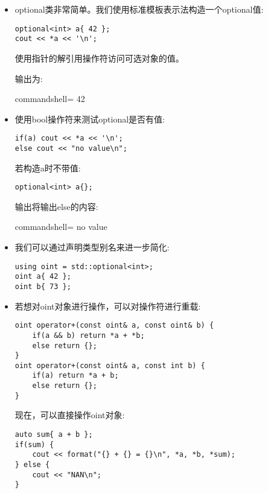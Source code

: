 \begin{itemize}
\item 
optional类非常简单。我们使用标准模板表示法构造一个optional值:

\begin{lstlisting}[style=styleCXX]
optional<int> a{ 42 };
cout << *a << '\n';
\end{lstlisting}

使用指针的解引用操作符访问可选对象的值。

输出为:

\begin{tcblisting}{commandshell={}}
42
\end{tcblisting}

\item 
使用bool操作符来测试optional是否有值:

\begin{lstlisting}[style=styleCXX]
if(a) cout << *a << '\n';
else cout << "no value\n";
\end{lstlisting}

若构造a时不带值:

\begin{lstlisting}[style=styleCXX]
optional<int> a{};
\end{lstlisting}

输出将输出else的内容:

\begin{tcblisting}{commandshell={}}
no value
\end{tcblisting}

\item 
我们可以通过声明类型别名来进一步简化:

\begin{lstlisting}[style=styleCXX]
using oint = std::optional<int>;
oint a{ 42 };
oint b{ 73 };
\end{lstlisting}

\item 
若想对oint对象进行操作，可以对操作符进行重载:

\begin{lstlisting}[style=styleCXX]
oint operator+(const oint& a, const oint& b) {
	if(a && b) return *a + *b;
	else return {};
}
oint operator+(const oint& a, const int b) {
	if(a) return *a + b;
	else return {};
}
\end{lstlisting}

现在，可以直接操作oint对象:

\begin{lstlisting}[style=styleCXX]
auto sum{ a + b };
if(sum) {
	cout << format("{} + {} = {}\n", *a, *b, *sum);
} else {
	cout << "NAN\n";
}
\end{lstlisting}


\end{itemize}
